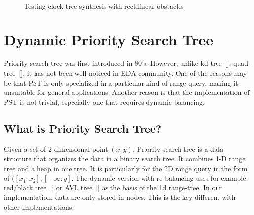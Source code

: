 \documentclass{acm_proc_article-sp}          %
\begin{document}
\begin{figure}[ht]
  \centering
  \\
  \caption{Testing clock tree synthesis with rectilinear obstacles}\label{fig:Final_DmeObst_topology}
\end{figure}

\section{Dynamic Priority Search Tree}
\label{sec:dyn-pst}
Priority search tree was first introduced in 80's. However, unlike
kd-tree~[], quad-tree~[], it has not been well noticed in EDA
community. One of the reasons may be that PST is only specialized in a
particular kind of range query, making it unsuitable for general
applications. Another reason is that the implementation of PST is not
trivial, especially one that requires dynamic balancing. 

\subsection{What is Priority Search Tree?}
Given a set of 2-dimensional point $(x,y)$.
Priority search tree is a data structure that organizes the data in a
binary search tree. It combines 1-D range tree
and a heap in one tree. It is particularly for the 2D range query in
the form of $([x_1:x_2], [-\infty:y]$. The dynamic version with
re-balancing uses for example red/black tree~[] or AVL tree~[] as the
basis of the 1d range-tree.
In our implementation, data are only stored in nodes. This is the key
different with other implementations.
\end{document}
